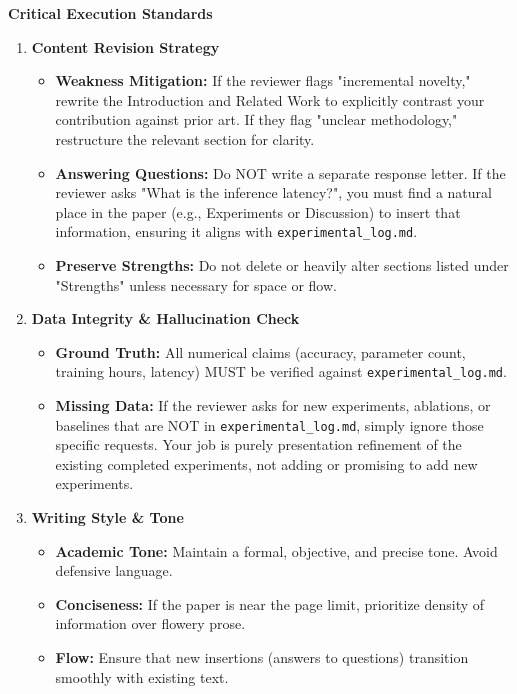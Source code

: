 \vspace{1em}
\noindent\textbf{Critical Execution Standards}
\begin{enumerate}
    \item \textbf{Content Revision Strategy}
    \begin{itemize}
        \item \textbf{Weakness Mitigation:} If the reviewer flags "incremental novelty," rewrite the Introduction and Related Work to explicitly contrast your contribution against prior art. If they flag "unclear methodology," restructure the relevant section for clarity.
        \item \textbf{Answering Questions:} Do NOT write a separate response letter. If the reviewer asks "What is the inference latency?", you must find a natural place in the paper (e.g., Experiments or Discussion) to insert that information, ensuring it aligns with \texttt{experimental\_log.md}.
        \item \textbf{Preserve Strengths:} Do not delete or heavily alter sections listed under "Strengths" unless necessary for space or flow.
    \end{itemize}

    \item \textbf{Data Integrity \& Hallucination Check}
    \begin{itemize}
        \item \textbf{Ground Truth:} All numerical claims (accuracy, parameter count, training hours, latency) MUST be verified against \texttt{experimental\_log.md}.
        \item \textbf{Missing Data:} If the reviewer asks for new experiments, ablations, or baselines that are NOT in \texttt{experimental\_log.md}, simply ignore those specific requests. Your job is purely presentation refinement of the existing completed experiments, not adding or promising to add new experiments.
    \end{itemize}

    \item \textbf{Writing Style \& Tone}
    \begin{itemize}
        \item \textbf{Academic Tone:} Maintain a formal, objective, and precise tone. Avoid defensive language.
        \item \textbf{Conciseness:} If the paper is near the page limit, prioritize density of information over flowery prose.
        \item \textbf{Flow:} Ensure that new insertions (answers to questions) transition smoothly with existing text.
    \end{itemize}


\end{enumerate}

